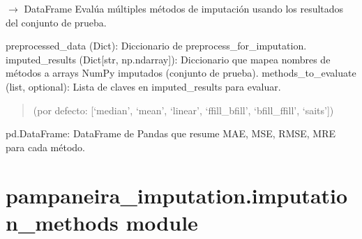\documentclass[letterpaper,10pt,english]{sphinxmanual}
\begin{document}
\begin{fulllineitems}
\label{\detokenize{pampaneira_imputation:pampaneira_imputation.evaluation.evaluate_all_methods}}
\pysigstartsignatures
\pysiglinewithargsret
{}
{\sphinxparamcomma {}\sphinxparamcomma {}}
{{ $\rightarrow$ DataFrame}}
\pysigstopsignatures
\sphinxAtStartPar
Evalúa múltiples métodos de imputación usando los resultados del conjunto de prueba.
\begin{description}
\sphinxAtStartPar
preprocessed\_data (Dict): Diccionario de preprocess\_for\_imputation.
imputed\_results (Dict{[}str, np.ndarray{]}): Diccionario que mapea nombres de métodos a arrays NumPy imputados (conjunto de prueba).
methods\_to\_evaluate (list, optional): Lista de claves en imputed\_results para evaluar.
\begin{quote}

\sphinxAtStartPar
(por defecto: {[}‘median’, ‘mean’, ‘linear’, ‘ffill\_bfill’, ‘bfill\_ffill’, ‘saits’{]})
\end{quote}

\sphinxAtStartPar
pd.DataFrame: DataFrame de Pandas que resume MAE, MSE, RMSE, MRE para cada método.

\end{description}

\end{fulllineitems}



\section{pampaneira\_imputation.imputation\_methods module}
\label{\detokenize{pampaneira_imputation:module-pampaneira_imputation.imputation_methods}}\label{\detokenize{pampaneira_imputation:pampaneira-imputation-imputation-methods-module}}
\end{document}
